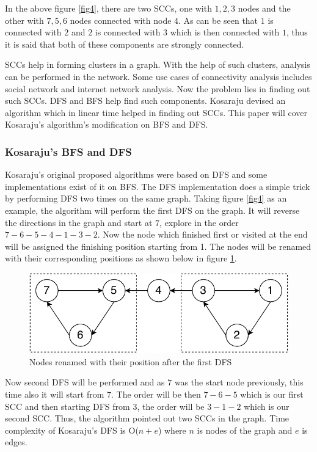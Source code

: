 \documentclass[journal,twoside,web]{ieeecolor}
\begin{document}
In the above figure \ref{fig4}, there are two SCCs, one with {$1, 2, 3$} nodes and the other with {$7, 5, 6$} nodes connected with node $4$. As can be seen that $1$ is connected with $2$ and $2$ is connected with $3$ which is then connected with $1$, thus it is said that both of these components are strongly connected.

SCCs help in forming clusters in a graph. With the help of such clusters, analysis can be performed in the network. Some use cases of connectivity analysis includes social network and internet network analysis. Now the problem lies in finding out such SCCs. DFS and BFS help find such components. Kosaraju devised an algorithm which in linear time helped in finding out SCCs\cite{40}. This paper will cover Kosaraju's algorithm's modification on BFS and DFS.

\subsubsection{Kosaraju's BFS and DFS}
Kosaraju's original proposed algorithms were based on DFS and some implementations exist of it on BFS. The DFS implementation does a simple trick by performing DFS two times on the same graph. Taking figure \ref{fig4} as an example, the algorithm will perform the first DFS on the graph. It will reverse the directions in the graph and start at $7$, explore in the order $7-6-5-4-1-3-2$. Now the node which finished first or visited at the end will be assigned the finishing position starting from 1. The nodes will be renamed with their corresponding positions as shown below in figure \ref{fig5}. 

\begin{figure}[!h]
    \centerline{\includegraphics[scale=0.75]{figures/scc2.pdf}}
    \caption{Nodes renamed with their position after the first DFS}
    \label{fig5}
\end{figure}

Now second DFS will be performed and as $7$ was the start node previously, this time also it will start from $7$. The order will be then $7-6-5$ which is our first SCC and then starting DFS from $3$, the order will be $3-1-2$ which is our second SCC. Thus, the algorithm pointed out two SCCs in the graph. Time complexity of Kosaraju’s DFS is O($n + e$) where $n$ is nodes of the graph and $e$ is edges.
\end{document}
